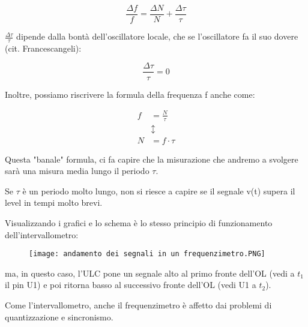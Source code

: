 {
    \Large 
    \begin{equation}
        \frac{\Delta f}{f}
        =
        \frac{\Delta N}{N}
        + 
        \frac{\Delta \tau}{\tau}
    \end{equation}
}

$\frac{\Delta \tau}{\tau} $ dipende dalla bontà dell'oscillatore locale, 
che se l'oscillatore fa il suo dovere (cit. Francescangeli): 

{
    \Large 
    \begin{equation}
        \frac{\Delta \tau}{\tau} = 0
    \end{equation}
}

Inoltre, possiamo riscrivere la formula della frequenza f anche come: 

{
    \Large 
    \begin{equation}
        \begin{split}
            f &= \frac{N}{\tau}
            \\ 
            &\updownarrow
            \\ 
            N &= f \cdot \tau
        \end{split}
    \end{equation}
}

Questa "banale" formula, ci fa capire che la misurazione che andremo a svolgere sarà una misura media lungo il periodo $\tau$. \newline 

Se $\tau$ è un periodo molto lungo, non si riesce a capire se il segnale v(t) supera il level in tempi molto brevi. \newline
 

Visualizzando i grafici e lo schema è lo stesso principio di funzionamento dell'intervallometro: 

\begin{figure}[h]
    \centering
    \texttt{[image: andamento dei segnali in un frequenzimetro.PNG]}
\end{figure}

ma, in questo caso, l'ULC pone un segnale alto al primo fronte dell'OL (vedi a $t_1$ il pin U1) 
e poi ritorna basso al successivo fronte dell'OL (vedi U1 a $t_2$). \newline 

Come l'intervallometro, anche il frequenzimetro è affetto dai problemi di quantizzazione e sincronismo. \newline 

\newpage 

